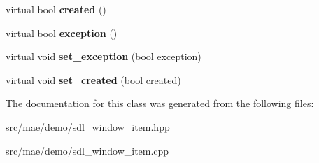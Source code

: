 \begin{DoxyCompactItemize}
\item 
\hypertarget{classmae_1_1demo_1_1sdl__window__item_a60e090b82e1f7f75911da0ad20f62c1c}{virtual bool {\bfseries created} ()}\label{classmae_1_1demo_1_1sdl__window__item_a60e090b82e1f7f75911da0ad20f62c1c}

\item 
\hypertarget{classmae_1_1demo_1_1sdl__window__item_a8fe69e6a06e2c07db0f374a0b3b5dfae}{virtual bool {\bfseries exception} ()}\label{classmae_1_1demo_1_1sdl__window__item_a8fe69e6a06e2c07db0f374a0b3b5dfae}

\item 
\hypertarget{classmae_1_1demo_1_1sdl__window__item_a788db959668b4b3e1cfb454ea0be9ded}{virtual void {\bfseries set\-\_\-exception} (bool exception)}\label{classmae_1_1demo_1_1sdl__window__item_a788db959668b4b3e1cfb454ea0be9ded}

\item 
\hypertarget{classmae_1_1demo_1_1sdl__window__item_a77edff64e79daab7a717d789a8d848cf}{virtual void {\bfseries set\-\_\-created} (bool created)}\label{classmae_1_1demo_1_1sdl__window__item_a77edff64e79daab7a717d789a8d848cf}

\end{DoxyCompactItemize}


The documentation for this class was generated from the following files\-:\begin{DoxyCompactItemize}
\item 
src/mae/demo/sdl\-\_\-window\-\_\-item.\-hpp\item 
src/mae/demo/sdl\-\_\-window\-\_\-item.\-cpp\end{DoxyCompactItemize}
